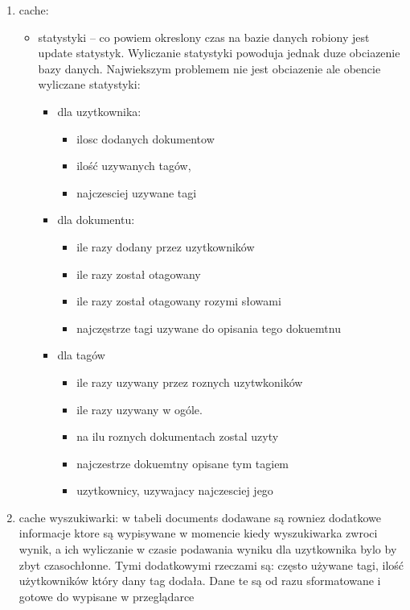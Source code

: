 \begin{enumerate}
\item cache:

\begin{itemize} 
\item statystyki -- co powiem okreslony czas na bazie danych robiony jest update statystyk. Wyliczanie statystyki powoduja jednak duze obciazenie bazy danych. Najwiekszym problemem nie jest obciazenie ale
obencie wyliczane statystyki:
\begin{itemize} 
    \item  dla uzytkownika:
	\begin{itemize} 
          		\item  ilosc dodanych dokumentow
	          	\item ilość uzywanych tagów,
	          	\item najczesciej uzywane tagi
	\end{itemize}
    \item  dla dokumentu:
	\begin{itemize} 
	          	\item ile razy dodany przez uzytkowników
	          	\item ile razy został otagowany
	          	\item ile razy został otagowany rozymi słowami
	          	\item najczęstrze tagi uzywane do opisania tego dokuemtnu
	\end{itemize}
    \item  dla tagów
	\begin{itemize} 
	          \item  ile razy uzywany przez roznych uzytwkoników
	          \item  ile razy uzywany w ogóle.
	          \item  na ilu roznych dokumentach zostal uzyty
	          \item  najczestrze dokuemtny opisane tym tagiem
	          \item  uzytkownicy, uzywajacy najczesciej jego
	\end{itemize}
\end{itemize}


\end{itemize}

\item cache wyszukiwarki: w tabeli documents dodawane są rowniez dodatkowe informacje ktore są wypisywane w momencie kiedy wyszukiwarka zwroci wynik, a ich wyliczanie w czasie podawania wyniku dla uzytkownika bylo by zbyt czasochłonne. Tymi dodatkowymi rzeczami są: często używane tagi, ilość użytkowników który dany tag dodała. Dane te są od razu sformatowane i gotowe do wypisane w przeglądarce

\end{enumerate}

